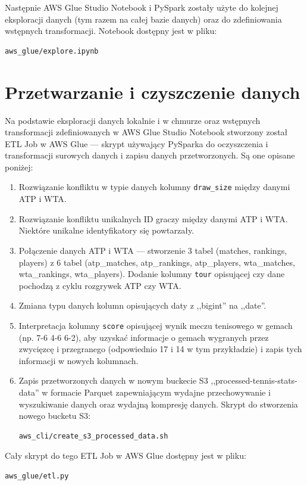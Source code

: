 \documentclass[12pt, a4paper]{article}
\begin{document}
Następnie AWS Glue Studio Notebook i PySpark zostały użyte do kolejnej eksploracji danych (tym razem na całej bazie danych) oraz do zdefiniowania wstępnych transformacji. Notebook dostępny jest w pliku:
\begin{verbatim}
aws_glue/explore.ipynb
\end{verbatim}


\section{Przetwarzanie i czyszczenie danych} \label{sec:transform}
Na podstawie eksploracji danych lokalnie i w chmurze oraz wstępnych transformacji zdefiniowanych w AWS Glue Studio Notebook stworzony został ETL Job w AWS Glue --- skrypt używający PySparka do oczyszczenia i transformacji surowych danych i zapisu danych przetworzonych. Są one opisane poniżej:
\begin{enumerate}
    \item Rozwiązanie konfliktu w typie danych kolumny \lstinline[style=verbatimStyle]{draw_size} między danymi ATP i WTA.
    \item Rozwiązanie konfliktu unikalnych ID graczy między danymi ATP i WTA. Niektóre unikalne identyfikatory się powtarzały.
    \item Połączenie danych ATP i WTA --- stworzenie 3 tabel (matches, rankings, players) z 6 tabel (atp\_matches, atp\_rankings, atp\_players, wta\_matches, wta\_rankings, wta\_players). Dodanie kolumny \lstinline[style=verbatimStyle]{tour} opisującej czy dane pochodzą z cyklu rozgrywek ATP czy WTA.
    \item Zmiana typu danych kolumn opisujących daty z ,,bigint'' na ,,date''.
    \item Interpretacja kolumny \lstinline[style=verbatimStyle]{score} opisującej wynik meczu tenisowego w gemach (np. 7-6 4-6 6-2), aby uzyskać informacje o gemach wygranych przez zwycięzcę i przegranego (odpowiednio 17 i 14 w tym przykładzie) i zapis tych informacji w nowych kolumnach.
    \item Zapis przetworzonych danych w nowym buckecie S3 ,,processed-tennis-stats-data'' w formacie Parquet zapewniającym wydajne przechowywanie i wyszukiwanie danych oraz wydajną kompresję danych. Skrypt do stworzenia nowego bucketu S3:
\begin{verbatim}
aws_cli/create_s3_processed_data.sh
\end{verbatim}
\end{enumerate}
Cały skrypt do tego ETL Job w AWS Glue dostępny jest w pliku:
\begin{verbatim}
aws_glue/etl.py
\end{verbatim}
\end{document}
